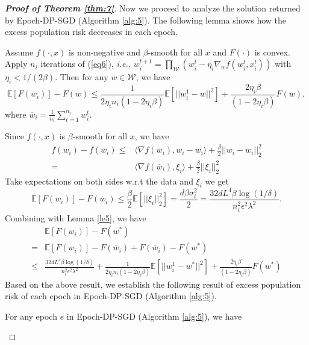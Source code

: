 \documentclass[12pt]{alt2022} %
\begin{document}
\begin{proof}[{\bf Proof of Theorem \ref{thm:7}}]
Now we proceed to analyze the solution returned by Epoch-DP-SGD (Algorithm \ref{alg:5}). The following lemma shows how the excess population risk decreases in each epoch.
\begin{lemma}\label{le5}
 Assume $f(\cdot, x)$ is non-negative and $\beta$-smooth for all $x$ and $F(\cdot)$ is convex.	Apply $n_i$ iterations of  (\ref{eq6}), {\em i.e.,} $w_i^{t+1}=\prod_{\mathcal{W}}(w_i^{t}-\eta_i\nabla_{w}f(w_{i}^{t},x_i^t))$ with $\eta_i<1/(2\beta)$. Then for any $w\in \mathcal{W}$, we have
	\begin{equation*}
	\mathbb{E}[F(\overline{w}_i)]-F(w)\leq \frac{1}{2\eta_i n_i(1-2\eta_i \beta)} \mathbb{E}[||w_i^1-w||^2]+\frac{2\eta_i\beta}{(1-2\eta_i\beta)}F(w),
	\end{equation*}
	where $\overline{w}_i=\frac{1}{n_i}\sum \limits_{t=1}^{n_i} w_i^t$.
\end{lemma}
Since $f(\cdot, x)$ is $\beta$-smooth for all $x$, we have 
\begin{align*}
f(w_i)-f(\overline{w}_i)\leq& \langle \nabla f(\overline{w}_i), w_i-\overline{w}_i\rangle +\frac{\beta}{2}||w_i-\overline{w}_i||_2^2\\=&\langle \nabla f(\overline{w}_i), \xi_i\rangle +\frac{\beta}{2}||\xi_i||_2^2
\end{align*}
Take expectations on both sides w.r.t the data and $\xi_i$ we  get 
\begin{equation*}
\mathbb{E}[F(w_i)]-F(\overline{w}_i)\leq\frac{\beta}{2}\mathbb{E}[||\xi_i||_2^2]=\frac{d\beta\sigma_i^2}{2}=\frac{32dL^4\beta\log(1/\delta)}{n_i^2\epsilon^2\lambda^2}.
\end{equation*}
Combining with Lemma \ref{le5}, we have 
\begin{equation}\label{eq9}
\begin{aligned}
&\mathbb{E}[F(w_i)]-F(w^{*})\\=&\mathbb{E}[F(w_i)]-F(\overline{w}_i)+F(\overline{w}_i)-F(w^{*})\\\leq&\frac{32dL^4\beta\log(1/\delta)}{n_i^2\epsilon^2\lambda^2}+ \frac{1}{2\eta_i n_i(1-2\eta_i \beta)} \mathbb{E}[||w_i^1-w^{*}||^2]+\frac{2\eta_i\beta}{(1-2\eta_i\beta)}F(w^{*})
\end{aligned}
\end{equation}
Based on the above result, we establish the following result of excess population risk of each epoch in Epoch-DP-SGD (Algorithm \ref{alg:5}).
\begin{lemma}\label{le6}
 For any epoch $e$ in Epoch-DP-SGD (Algorithm \ref{alg:5}), we have 

\end{lemma}
\end{proof}
\end{document}
